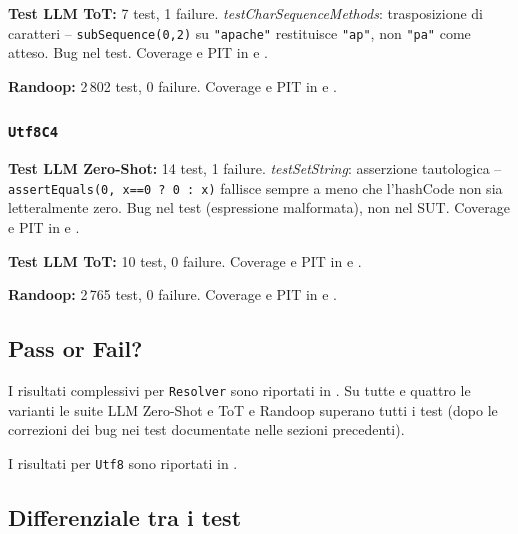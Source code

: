 \textbf{Test LLM ToT:} 7 test, 1 failure.
\textit{testCharSequenceMethods}: trasposizione di caratteri --
\texttt{subSequence(0,2)} su \texttt{"apache"} restituisce
\texttt{"ap"}, non \texttt{"pa"} come atteso. Bug nel test.
Coverage e PIT in  e
.

\textbf{Randoop:} 2\,802 test, 0 failure.
Coverage e PIT in  e
.

\subsubsection{\texttt{Utf8C4}}

\textbf{Test LLM Zero-Shot:} 14 test, 1 failure.
\textit{testSetString}: asserzione tautologica --
\texttt{assertEquals(0,~x==0~?~0~:~x)} fallisce sempre a meno che
l'hashCode non sia letteralmente zero. Bug nel test (espressione
malformata), non nel SUT.
Coverage e PIT in  e
.

\textbf{Test LLM ToT:} 10 test, 0 failure.
Coverage e PIT in  e
.

\textbf{Randoop:} 2\,765 test, 0 failure.
Coverage e PIT in  e
.

\subsection{Pass or Fail?}

I risultati complessivi per \texttt{Resolver} sono riportati in
. Su tutte e quattro le varianti le suite
LLM Zero-Shot e ToT e Randoop superano tutti i test (dopo le
correzioni dei bug nei test documentate nelle sezioni precedenti).

I risultati per \texttt{Utf8} sono riportati in
.

\subsection{Differenziale tra i test}

